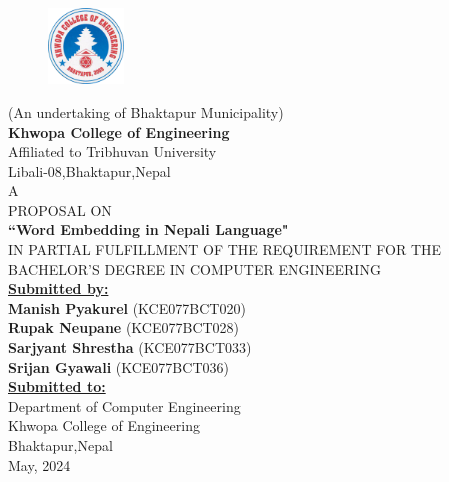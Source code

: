 \begin{center}
	\thispagestyle{empty}
	\begin{figure}[h!]
		\centering
			\includegraphics[width=0.18\textwidth]{img/khwopa logo hd.png}
	\end{figure}
	 \normalsize(An undertaking of Bhaktapur Municipality)\\
	 \Large\textbf{Khwopa College of Engineering}\\
	 \normalsize Affiliated to Tribhuvan University\\
	\normalsize{{{Libali-08,Bhaktapur,Nepal}}\\[0.75cm]
	\large{A \\PROPOSAL ON\\\textbf{``Word Embedding in Nepali Language"}}\\\vspace{0.1in}
	 \normalsize{IN PARTIAL FULFILLMENT OF THE REQUIREMENT
FOR THE BACHELOR’S DEGREE IN COMPUTER ENGINEERING} \\[0.65cm]
	
	
	
	\large\textbf{\underline{Submitted by:}}\\
	
{\bf Manish Pyakurel} (KCE077BCT020)\\
{\bf Rupak Neupane} (KCE077BCT028)\\
{\bf Sarjyant Shrestha} (KCE077BCT033)\\
{\bf Srijan Gyawali} (KCE077BCT036)\\[0.75cm]

	\large\textbf{\underline{Submitted to:}}\\

\large Department of Computer Engineering\\
\large Khwopa College of Engineering\\
\large Bhaktapur,Nepal\\[0.75cm]
\large{May, 2024}
}
\end{center}